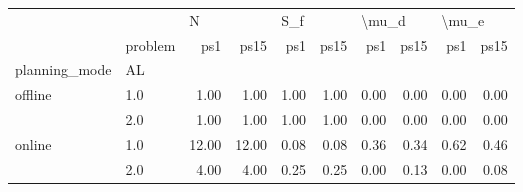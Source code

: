 \begin{tabular}{llrrrrrrrr}
\toprule
       & {} & \multicolumn{2}{l}{N} & \multicolumn{2}{l}{S\_f} & \multicolumn{2}{l}{\textbackslash mu\_d} & \multicolumn{2}{l}{\textbackslash mu\_e} \\
       & problem &   ps1 &  ps15 &  ps1 & ps15 &   ps1 & ps15 &   ps1 & ps15 \\
planning\_mode & AL &       &       &      &      &       &      &       &      \\
\midrule
offline & 1.0 &  1.00 &  1.00 & 1.00 & 1.00 &  0.00 & 0.00 &  0.00 & 0.00 \\
       & 2.0 &  1.00 &  1.00 & 1.00 & 1.00 &  0.00 & 0.00 &  0.00 & 0.00 \\
online & 1.0 & 12.00 & 12.00 & 0.08 & 0.08 &  0.36 & 0.34 &  0.62 & 0.46 \\
       & 2.0 &  4.00 &  4.00 & 0.25 & 0.25 &  0.00 & 0.13 &  0.00 & 0.08 \\
\bottomrule
\end{tabular}
